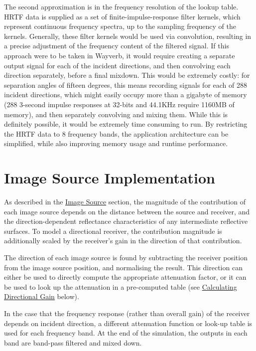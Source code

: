 \documentclass[]{scrreprt}
\begin{document}
The second approximation is in the frequency resolution of the lookup
table. HRTF data is supplied as a set of finite-impulse-response filter
kernels, which represent continuous frequency spectra, up to the
sampling frequency of the kernels. Generally, these filter kernels would
be used via convolution, resulting in a precise adjustment of the
frequency content of the filtered signal. If this approach were to be
taken in Wayverb, it would require creating a separate output signal for
each of the incident directions, and then convolving each direction
separately, before a final mixdown. This would be extremely costly: for
separation angles of fifteen degrees, this means recording signals for
each of 288 incident directions, which might easily occupy more than a
gigabyte of memory (288 3-second impulse responses at 32-bits and
44.1KHz require 1160MB of memory), and then separately convolving and
mixing them. While this is definitely possible, it would be extremely
time consuming to run. By restricting the HRTF data to 8 frequency
bands, the application architecture can be simplified, while also
improving memory usage and runtime performance.

\section{Image Source Implementation}\label{image-source-implementation}

As described in the
\href{\%7B\%7B\%20site.baseurl\%20\%7D\%7D\%7B\%\%20link\%20image_source.md\%20\%\%7D}{Image
Source} section, the magnitude of the contribution of each image source
depends on the distance between the source and receiver, and the
direction-dependent reflectance characteristics of any intermediate
reflective surfaces. To model a directional receiver, the contribution
magnitude is additionally scaled by the receiver's gain in the direction
of that contribution.

The direction of each image source is found by subtracting the receiver
position from the image source position, and normalising the result.
This direction can either be used to directly compute the appropriate
attenuation factor, or it can be used to look up the attenuation in a
pre-computed table (see
\protect\hyperlink{calculating-directional-gain}{Calculating Directional
Gain} below).

In the case that the frequency response (rather than overall gain) of
the receiver depends on incident direction, a different attenuation
function or look-up table is used for each frequency band. At the end of
the simulation, the outputs in each band are band-pass filtered and
mixed down.
\end{document}
